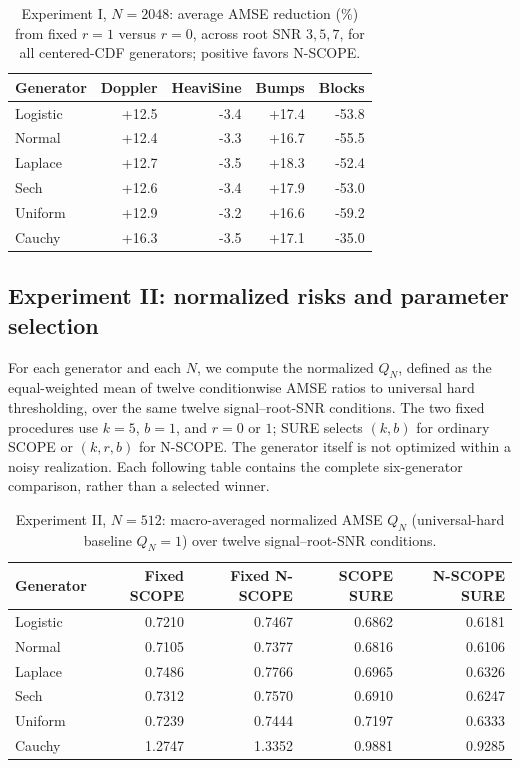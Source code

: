 \documentclass[11pt]{article}
\numberwithin{equation}{section}
\begin{document}
\begin{table}[H]
\centering\small
\caption{Experiment I, $N=2048$: average AMSE reduction (\%) from fixed $r=1$ versus $r=0$, across root SNR $3,5,7$, for all centered-CDF generators; positive favors N-SCOPE.}
\label{tab:s5-gain-2048}
\setlength{\tabcolsep}{5pt}
\begin{tabular}{lrrrr}
\toprule
Generator & Doppler & HeaviSine & Bumps & Blocks \\
\midrule
Logistic & +12.5 & -3.4 & +17.4 & -53.8 \\
Normal & +12.4 & -3.3 & +16.7 & -55.5 \\
Laplace & +12.7 & -3.5 & +18.3 & -52.4 \\
Sech & +12.6 & -3.4 & +17.9 & -53.0 \\
Uniform & +12.9 & -3.2 & +16.6 & -59.2 \\
Cauchy & +16.3 & -3.5 & +17.1 & -35.0 \\
\bottomrule
\end{tabular}
\end{table}


\subsection{Experiment II: normalized risks and parameter selection}
\label{sec:supp-e2}
For each generator and each $N$, we compute the normalized
$Q_N$, defined as the equal-weighted mean of twelve conditionwise AMSE ratios to universal hard thresholding, over the same twelve
signal--root-SNR conditions. The two fixed procedures use $k=5$,
$b=1$, and $r=0$ or $1$; SURE selects $(k,b)$ for ordinary SCOPE
or $(k,r,b)$ for N-SCOPE. The generator itself is not optimized
within a noisy realization. Each following table contains the complete
six-generator comparison, rather than a selected winner.

\begin{table}[H]
\centering\small
\caption{Experiment II, $N=512$: macro-averaged normalized AMSE $Q_N$ (universal-hard baseline $Q_N=1$) over twelve signal--root-SNR conditions.}
\label{tab:s5-e2-q-512}
\setlength{\tabcolsep}{5pt}
\begin{tabular}{lrrrr}
\toprule
Generator & Fixed SCOPE & Fixed N-SCOPE & SCOPE SURE & N-SCOPE SURE \\
\midrule
Logistic & 0.7210 & 0.7467 & 0.6862 & 0.6181 \\
Normal & 0.7105 & 0.7377 & 0.6816 & 0.6106 \\
Laplace & 0.7486 & 0.7766 & 0.6965 & 0.6326 \\
Sech & 0.7312 & 0.7570 & 0.6910 & 0.6247 \\
Uniform & 0.7239 & 0.7444 & 0.7197 & 0.6333 \\
Cauchy & 1.2747 & 1.3352 & 0.9881 & 0.9285 \\
\bottomrule
\end{tabular}
\end{table}
\end{document}
